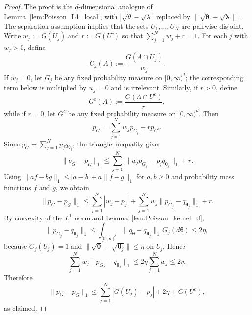 \documentclass[twoside,12pt]{article}
\begin{document}
\begin{proof}
The proof is the $d$-dimensional analogue of Lemma~\ref{lem:Poisson_L1_local}, with $|\sqrt{\theta}-\sqrt{\lambda}|$ replaced by $\|\sqrt{\boldsymbol\theta}-\sqrt{\boldsymbol\lambda}\|$. The separation assumption implies that the sets $U_1,\ldots,U_N$ are pairwise disjoint. Write $w_j:=G(U_j)$ and $r:=G(U^c)$ so that $\sum_{j=1}^N w_j+r=1$. For each $j$ with $w_j>0$, define
\begin{displaymath}
G_j(A):=\frac{G(A\cap U_j)}{w_j}.
\end{displaymath}
If $w_j=0$, let $G_j$ be any fixed probability measure on $[0,\infty)^d$; the corresponding term below is multiplied by $w_j=0$ and is irrelevant. Similarly, if $r>0$, define
\begin{displaymath}
G^c(A):=\frac{G(A\cap U^c)}{r},
\end{displaymath}
while if $r=0$, let $G^c$ be any fixed probability measure on $[0,\infty)^d$. Then
\begin{displaymath}
p_G=\sum_{j=1}^N w_jp_{G_j}+rp_{G^c}.
\end{displaymath}
Since $p_{\tilde G}=\sum_{j=1}^N p_jq_{\boldsymbol\theta_j}$, the triangle inequality gives
\begin{displaymath}
\|p_G-p_{\tilde G}\|_1\le\sum_{j=1}^N\|w_jp_{G_j}-p_jq_{\boldsymbol\theta_j}\|_1+r.
\end{displaymath}
Using $\|af-bg\|_1\le |a-b|+a\|f-g\|_1$ for $a,b\ge0$ and probability mass functions $f$ and $g$, we obtain
\begin{displaymath}
\|p_G-p_{\tilde G}\|_1\le\sum_{j=1}^N |w_j-p_j|+\sum_{j=1}^N w_j\|p_{G_j}-q_{\boldsymbol\theta_j}\|_1+r.
\end{displaymath}
By convexity of the $L^1$ norm and Lemma~\ref{lem:Poisson_kernel_d},
\begin{displaymath}
\|p_{G_j}-q_{\boldsymbol\theta_j}\|_1\le\int_{[0,\infty)^d}\|q_{\boldsymbol\theta}-q_{\boldsymbol\theta_j}\|_1\,G_j(d\boldsymbol\theta)\le2\eta,
\end{displaymath}
because $G_j(U_j)=1$ and $\|\sqrt{\boldsymbol\theta}-\sqrt{\boldsymbol\theta_j}\|\le\eta$ on $U_j$. Hence
\begin{displaymath}
\sum_{j=1}^N w_j\|p_{G_j}-q_{\boldsymbol\theta_j}\|_1\le2\eta\sum_{j=1}^N w_j\le2\eta.
\end{displaymath}
Therefore
\begin{displaymath}
\|p_G-p_{\tilde G}\|_1\le\sum_{j=1}^N |G(U_j)-p_j|+2\eta+G(U^c),
\end{displaymath}
as claimed.
\end{proof}
\end{document}
